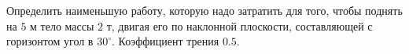 Определить наименьшую работу, которую надо затратить для того, чтобы
поднять на $5$ м тело массы $2$ т, двигая его по наклонной плоскости, 
составляющей с горизонтом угол в $30^\circ$. Коэффициент трения $0.5$.
 
 
